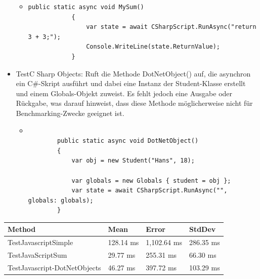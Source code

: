 \begin{itemize}
    \begin{itemize}
        \item 
        \begin{lstlisting}[language={[Sharp]C}, caption=C\#Scripting MySum, label=lst:imp:cscnumber]
            public static async void MySum()
            {
                var state = await CSharpScript.RunAsync("return 3 + 3;");
                Console.WriteLine(state.ReturnValue);
            }
        \end{lstlisting}
    \end{itemize}
    \item TestC \textunderscore Sharp \textunderscore Objects: Ruft die Methode DotNetObject() auf, die asynchron ein C\#-Skript ausführt und dabei eine Instanz der Student-Klasse erstellt und einem Globals-Objekt zuweist. Es fehlt jedoch eine Ausgabe oder Rückgabe, was darauf hinweist, dass diese Methode möglicherweise nicht für Benchmarking-Zwecke geeignet ist.
    \begin{itemize}
        \item 
        \begin{lstlisting}[language={[Sharp]C}, caption=C\#Scripting ReturnNumber, label=lst:imp:cscnumber]

        public static async void DotNetObject()
        {
            var obj = new Student("Hans", 18);

            var globals = new Globals { student = obj };
            var state = await CSharpScript.RunAsync("", globals: globals);
        }
        \end{lstlisting}
    \end{itemize}
\end{itemize}
 
     \begin{table}[H]
            \begin{tabular}{|p{3.5cm}|p{3cm}|p{3cm}|p{3cm}|}
            \hline
                Method & Mean & Error & StdDev \\ \hline
                TestJavascriptSimple & 128.14 ms & 1,102.64 ms & 286.35 ms  \\ \hline
                TestJavaScriptSum & 29.77 ms & 255.31 ms & 66.30 ms \\ \hline
                TestJavascript-DotNetObjects & 46.27 ms & 397.72 ms & 103.29 ms  \\ \hline
            \end{tabular}
        \end{table}

